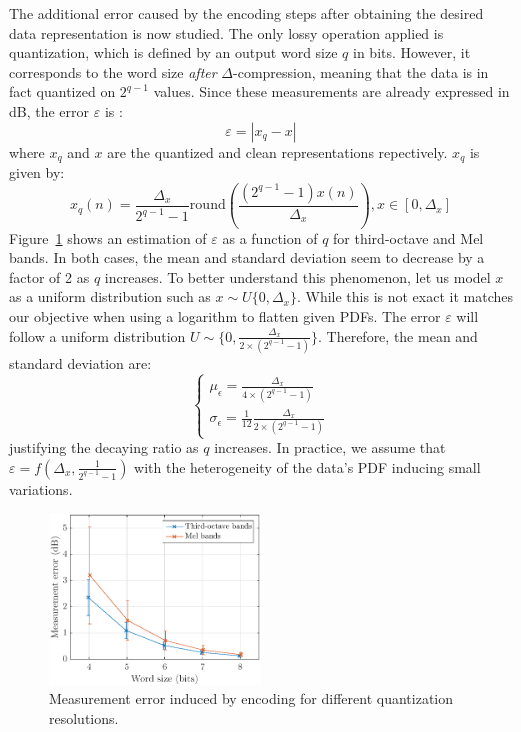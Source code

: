 \documentclass[sensors,article,submit,moreauthors,pdftex,10pt,a4paper]{mdpi}
\providecommand{\DIFaddtex}[1]{{\protect\color{blue}\uwave{#1}}} %
\providecommand{\DIFaddbegin}{} %
\providecommand{\DIFaddend}{} %
\providecommand{\DIFadd}[1]{\texorpdfstring{\DIFaddtex{#1}}{#1}} %
\begin{document}
The additional error caused by the encoding steps after obtaining the desired data representation is now studied. The only lossy operation applied is quantization, which is defined by an output word size $q$ in bits. However, it corresponds to the word size \textit{after} $\Delta$-compression, meaning that the data is in fact quantized on $2^{q-1}$ values. Since these measurements are already expressed in dB, the error $\varepsilon$ is \DIFaddbegin \DIFadd{computed as}\DIFaddend :
\begin{equation*}
	\varepsilon = |x_q-x|
\end{equation*}
where $x_q$ and $x$ are the quantized and clean representations repectively. $x_q$ is given by:
\begin{equation*}
x_q(n) = \frac{\Delta_x}{2^{q-1}-1}\textrm{round}\left(\frac{(2^{q-1}-1)x(n)}{\Delta_x}\right), x\in \left[0, \Delta_x\right]
\end{equation*}
Figure~\ref{fig:error_q} shows an estimation of $\varepsilon$ as a function of $q$ for third-octave and Mel bands. In both cases, the mean and standard deviation seem to decrease by a factor of 2 as $q$ increases. To better understand this phenomenon, let us model $x$ as a uniform distribution such as $x\sim \textit{U}\{0, \Delta_x\}$. While this is not exact it matches our objective when using a logarithm to flatten given PDFs. The error $\varepsilon$ will follow a uniform distribution $U\sim \{0, \frac{\Delta_x}{2\times (2^{q-1}-1)}\}$. Therefore, the mean and standard deviation are:
\[
\begin{cases}
	\mu_\epsilon = \frac{\Delta_x}{4\times (2^{q-1}-1)}\\
	\sigma_\epsilon = \frac{1}{12}\frac{\Delta_x}{2\times (2^{q-1}-1)}
\end{cases}
\]
justifying the decaying ratio as $q$ increases. In practice, we assume that $\varepsilon = f(\Delta_x, \frac{1}{2^{q-1}-1})$ with the heterogeneity of the data's PDF inducing small variations.

\begin{figure}[htbp]
	\centering
		\includegraphics[width=0.5\textwidth]{figures/error_qall.eps}
	\caption{Measurement error induced by encoding for different quantization resolutions.}
	\label{fig:error_q}
\end{figure}
\end{document}
